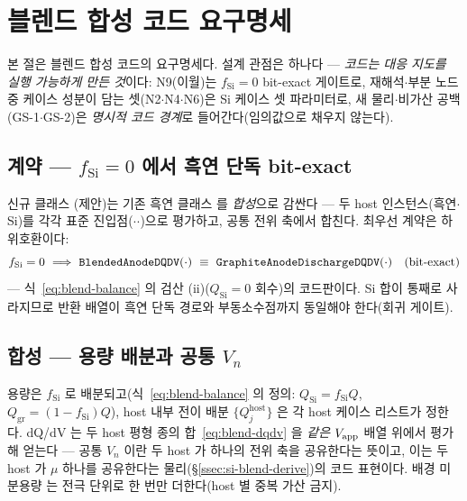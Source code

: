 \section{블렌드 합성 코드 요구명세}\label{sec:si-code}
본 절은 블렌드 합성 코드의 요구명세다. 설계 관점은 하나다 ---
\emph{코드는 대응 지도를 실행 가능하게 만든 것}이다: N9(이월)는 $f_\mathrm{Si}{=}0$ bit-exact
게이트로, 재해석$\cdot$부분 노드 중 케이스 성분이 담는 셋(N2$\cdot$N4$\cdot$N6)은 Si 케이스 셋 파라미터로, 새 물리$\cdot$비가산 공백
(GS-1$\cdot$GS-2)은 \emph{명시적 코드 경계}로 들어간다(임의값으로 채우지 않는다).

\subsection{계약 --- $f_\mathrm{Si}{=}0$ 에서 흑연 단독 bit-exact}\label{ssec:code-contract}
신규 클래스 (제안)는 기존 흑연 클래스
 를 \emph{합성}으로 감싼다 --- 두 host 인스턴스(흑연$\cdot$Si)를 각각
표준 진입점($\cdot$$\cdot$)으로 평가하고, 공통 전위 축에서
합친다. 최우선 계약은 하위호환이다:
\begin{equation}
f_\mathrm{Si}=0\ \Longrightarrow\ \code{BlendedAnodeDQDV}(\cdot)\ \equiv\ \code{GraphiteAnodeDischargeDQDV}(\cdot)
\quad(\text{bit-exact})
\label{eq:si-code-bitexact}
\end{equation}
--- 식~\eqref{eq:blend-balance} 의 검산 (ii)($Q_\mathrm{Si}{=}0$ 회수)의 코드판이다. Si 합이 통째로
사라지므로 반환 배열이 흑연 단독 경로와 부동소수점까지 동일해야 한다(회귀 게이트).

\subsection{합성 --- 용량 배분과 공통 $V_n$}\label{ssec:code-synth}
용량은 $f_\mathrm{Si}$ 로 배분되고(식~\eqref{eq:blend-balance} 의 정의: $Q_\mathrm{Si}{=}f_\mathrm{Si}Q$,
$Q_\mathrm{gr}{=}(1{-}f_\mathrm{Si})Q$), host 내부 전이 배분 $\{Q_j^{\mathrm{host}}\}$ 은 각 host 케이스
리스트가 정한다. dQ/dV 는 두 host 평형 종의 합~\eqref{eq:blend-dqdv} 을 \emph{같은} $V_{\mathrm{app}}$ 배열
위에서 평가해 얻는다 --- 공통 $V_n$ 이란 두 host 가 하나의 전위 축을 공유한다는 뜻이고, 이는 두 host 가
$\mu$ 하나를 공유한다는 물리(\S\ref{ssec:si-blend-derive})의 코드 표현이다. 배경 미분용량  는
전극 단위로 한 번만 더한다(host 별 중복 가산 금지).

